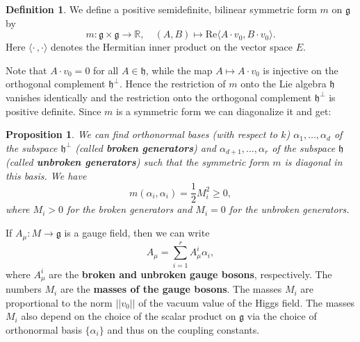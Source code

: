 \documentclass[11pt]{amsart}
\newtheorem{prop}[thm]{Proposition}
\theoremstyle{definition}
\newtheorem{defn}[thm]{Definition}
\theoremstyle{remark}
\numberwithin{equation}{section}
\begin{document}
\begin{defn}\label{defn bilinear m} We define a positive semidefinite, bilinear symmetric form $m$ on $\mathfrak{g}$ by
\begin{equation*}
m\colon\mathfrak{g}\times\mathfrak{g}\longrightarrow\mathbb{R},\quad (A,B)\longmapsto\mathrm{Re}\langle A\cdot v_0,B\cdot v_0\rangle.
\end{equation*}
Here $\langle\cdot\,,\cdot\rangle$ denotes the Hermitian inner product on the vector space $E$.
\end{defn}
Note that $A\cdot v_0=0$ for all $A\in\mathfrak{h}$, while the map $A\mapsto A\cdot v_0$ is injective on the orthogonal complement $\mathfrak{h}^\perp$. Hence the restriction of $m$ onto the Lie algebra $\mathfrak{h}$ vanishes identically and the restriction onto the orthogonal complement $\mathfrak{h}^\perp$ is positive definite. Since $m$ is a symmetric form we can diagonalize it and get:
\begin{prop}We can find orthonormal bases (with respect to $k$) $\alpha_1,\ldots,\alpha_d$ of the subspace $\mathfrak{h}^\perp$ (called {\bf broken generators}) and $\alpha_{d+1},\ldots,\alpha_r$ of the subspace $\mathfrak{h}$ (called {\bf unbroken generators}) such that the symmetric form $m$ is diagonal in this basis. We have 
\begin{equation*}
m(\alpha_i,\alpha_i)=\frac{1}{2}M_i^2\geq 0,
\end{equation*}
where $M_i>0$ for the broken generators and $M_i=0$ for the unbroken generators. 
\end{prop}
If $A_\mu\colon M\rightarrow \mathfrak{g}$ is a gauge field, then we can write 
\begin{equation*}
A_\mu=\sum_{i=1}^r A_\mu^i\alpha_i,
\end{equation*} 
where $A_\mu^i$ are the {\bf broken and unbroken gauge bosons}, respectively. The numbers $M_i$ are the {\bf masses of the gauge bosons}. The masses $M_i$ are proportional to the norm $||v_0||$ of the vacuum value of the Higgs field. The masses $M_i$ also depend on the choice of the scalar product on $\mathfrak{g}$ via the choice of orthonormal basis $\{\alpha_i\}$ and thus on the coupling constants.
\end{document}
